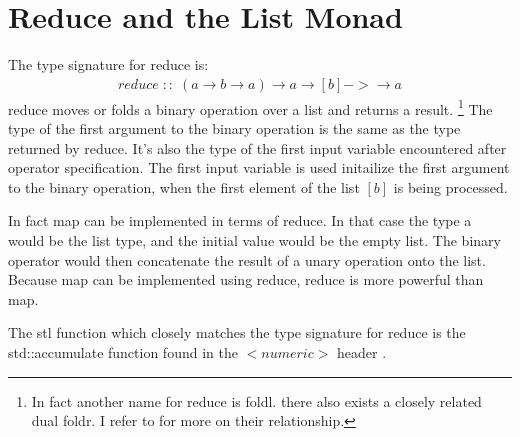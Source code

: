 \documentclass[12pt,fleqn]{article}
\begin{document}
\section*{Reduce and the List Monad}
The type signature for reduce is:
\begin{eqnarray*}
reduce \;::\; (a \rightarrow b \rightarrow a) \rightarrow a \rightarrow [b] -> \rightarrow a
\end{eqnarray*}
reduce moves or folds a binary operation over a list and returns a result.
\footnote{In fact another name for reduce is foldl. there also exists a closely related dual foldr.
I refer to \cite{bird, hutton} for more on their relationship.}
The type of the first argument to the binary operation is the same as the type returned by reduce. 
It's also the type of the first input variable encountered after operator specification.
The first input variable is used initailize the first argument to the binary operation, when the first element of the list $[b]$ is being processed.

In fact map can be implemented in terms of reduce.
In that case the type a would be the list type, and the initial value would be the empty list.
The binary operator would then concatenate the result of a unary operation onto the list.
Because map can be implemented using reduce, reduce is more powerful than map.

The stl function which closely matches the type signature for reduce is the std::accumulate function found in the $<numeric>$ header \cite{josuttis,std::accumulate}.
\end{document}
